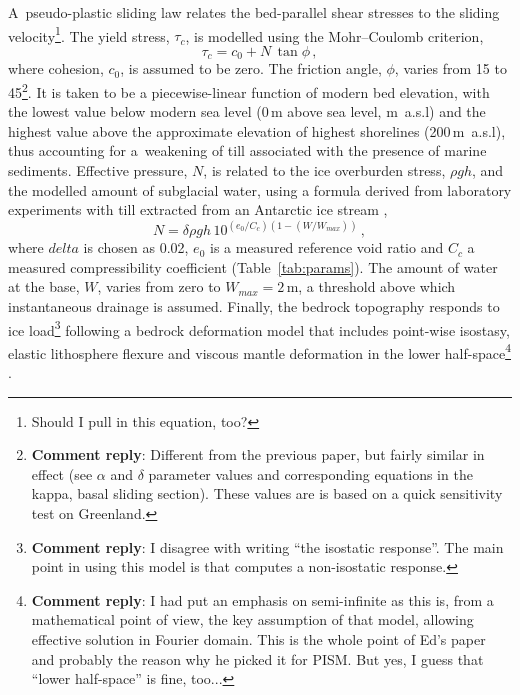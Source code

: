 \documentclass[tc, manuscript]{copernicus}
\newcommand{\renote}[1]{\footnote{\textbf{Comment reply}: #1}}
\begin{document}
A~pseudo-plastic sliding law \citep{Bueler.Pelt.2014} relates the
bed-parallel shear stresses to the sliding velocity\footnote{
    Should I pull in this equation, too?}.
The yield stress, $\tau_c$,
is modelled using the Mohr--Coulomb criterion,
\begin{equation}
   \tau_c = c_0 + N\,\tan{\phi} \,,
\end{equation}
where cohesion, $c_0$, is assumed to be zero. The friction angle, $\phi$,
varies from 15 to 45{\degree}\renote{
    Different from the previous paper, but fairly similar in effect (see
    $\alpha$ and $\delta$ parameter values and corresponding equations in the
    kappa, basal sliding section). These values are is based on a quick
    sensitivity test on Greenland.}.
It is taken to be a piecewise-linear function of modern bed elevation, with
the lowest value below modern sea level (0\,m above sea level, m~a.s.l) and the
highest value above the approximate elevation of highest shorelines
(200\,m~a.s.l), thus accounting for a~weakening of
till associated with the presence of marine sediments. Effective pressure, $N$,
is related to the ice overburden stress, $\rho gh$, and the modelled amount of
subglacial water, using a formula derived from laboratory experiments with till
extracted from an Antarctic ice stream \citep{Tulaczyk.etal.2000,
Bueler.Pelt.2014},
\begin{equation}
    N = \delta \rho gh \, 10^{(e_0/C_c) (1 - (W/W_{max}))} \,,
\end{equation}
where $delta$ is chosen as 0.02, $e_0$ is a measured reference void ratio and
$C_c$ a measured compressibility coefficient (Table~\ref{tab:params}). The
amount of water at the base, $W$, varies from zero to $W_{max}=2$\,m, a
threshold above which instantaneous drainage is assumed.
Finally, the bedrock topography responds to ice load\renote{
    I disagree with writing ``the isostatic response''. The main point in
    using this model is that computes a non-isostatic response.}
following a bedrock deformation model that includes point-wise isostasy,
elastic lithosphere flexure and viscous mantle deformation in the lower
half-space\renote{
    I had put an emphasis on semi-infinite as this is, from a mathematical
    point of view, the key assumption of that model, allowing effective
    solution in Fourier domain. This is the whole point of Ed's paper and
    probably the reason why he picked it for PISM. But yes, I guess that
    ``lower half-space'' is fine, too...}
\citep[Table~\ref{tab:params};][]{Lingle.Clark.1985,Bueler.etal.2007}.
\end{document}

